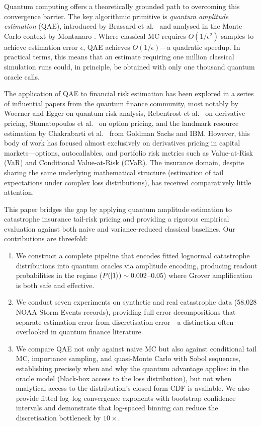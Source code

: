 \documentclass[11pt,a4paper]{article}
\begin{document}
Quantum computing offers a theoretically grounded path to overcoming this convergence barrier. The key algorithmic primitive is \emph{quantum amplitude estimation} (QAE), introduced by Brassard et al.\ \cite{Brassard2002} and analysed in the Monte Carlo context by Montanaro \cite{Montanaro2015}. Where classical MC requires $O(1/\epsilon^2)$ samples to achieve estimation error $\epsilon$, QAE achieves $O(1/\epsilon)$---a quadratic speedup. In practical terms, this means that an estimate requiring one million classical simulation runs could, in principle, be obtained with only one thousand quantum oracle calls.

The application of QAE to financial risk estimation has been explored in a series of influential papers from the quantum finance community, most notably by Woerner and Egger \cite{Woerner2019} on quantum risk analysis, Rebentrost et al.\ \cite{Rebentrost2018} on derivative pricing, Stamatopoulos et al.\ \cite{Stamatopoulos2020} on option pricing, and the landmark resource estimation by Chakrabarti et al.\ \cite{Chakrabarti2021} from Goldman Sachs and IBM. However, this body of work has focused almost exclusively on derivatives pricing in capital markets---options, autocallables, and portfolio risk metrics such as Value-at-Risk (VaR) and Conditional Value-at-Risk (CVaR). The insurance domain, despite sharing the same underlying mathematical structure (estimation of tail expectations under complex loss distributions), has received comparatively little attention.

This paper bridges the gap by applying quantum amplitude estimation to catastrophe insurance tail-risk pricing and providing a rigorous empirical evaluation against both naive and variance-reduced classical baselines. Our contributions are threefold:

\begin{enumerate}
    \item We construct a complete pipeline that encodes fitted lognormal catastrophe distributions into quantum oracles via amplitude encoding, producing readout probabilities in the regime ($P(\ket{1}) \sim 0.002$--$0.05$) where Grover amplification is both safe and effective.
    \item We conduct seven experiments on synthetic and real catastrophe data (58,028 NOAA Storm Events records), providing full error decompositions that separate estimation error from discretisation error---a distinction often overlooked in quantum finance literature.
    \item We compare QAE not only against naive MC but also against conditional tail MC, importance sampling, and quasi-Monte Carlo with Sobol sequences, establishing precisely when and why the quantum advantage applies: in the oracle model (black-box access to the loss distribution), but not when analytical access to the distribution's closed-form CDF is available. We also provide fitted log--log convergence exponents with bootstrap confidence intervals and demonstrate that log-spaced binning can reduce the discretisation bottleneck by $10\times$.
\end{enumerate}
\end{document}
